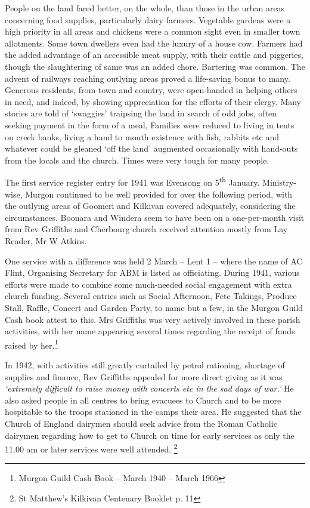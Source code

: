 People on the land fared better, on the whole, than those in the urban areas concerning food supplies, particularly dairy farmers. Vegetable gardens were a high priority in all areas and chickens were a common sight even in smaller town allotments. Some town dwellers even had the luxury of a house cow. Farmers had the added advantage of an accessible meat supply, with their cattle and piggeries, though the slaughtering of same was an added chore. Bartering was common. The advent of railways reaching outlying areas proved a life-saving bonus to many. Generous residents, from town and country, were open-handed in helping others in need, and indeed, by showing appreciation for the efforts of their clergy. Many stories are told of `swaggies' traipsing the land in search of odd jobs, often seeking payment in the form of a meal, Families were reduced to living in tents on creek banks, living a hand to mouth existence with fish, rabbits etc and whatever could be gleaned `off the land' augmented occasionally with hand-outs from the locals and the church. Times were very tough for many people.



The first service register entry for 1941 was Evensong on 5\textsuperscript{th} January. Ministry-wise, Murgon continued to be well provided for over the following period, with the outlying areas of Goomeri and Kilkivan covered adequately, considering the circumstances. Boonara and Windera seem to have been on a one-per-month visit from Rev Griffiths and Cherbourg church received attention mostly from Lay Reader, Mr W Atkins.



One service with a difference was held 2 March -- Lent 1 -- where the name of AC Flint, Organising Secretary for ABM is listed as officiating. During 1941, various efforts were made to combine some much-needed social engagement with extra church funding. Several entries such as Social Afternoon, Fete Takings, Produce Stall, Raffle, Concert and Garden Party, to name but a few, in the Murgon Guild Cash book attest to this. Mrs Griffiths was very actively involved in these parish activities, with her name appearing several times regarding the receipt of funds raised by her.\footnote{Murgon Guild Cash Book -- March 1940 -- March 1966}


In 1942, with activities still greatly curtailed by petrol rationing, shortage of supplies and finance, Rev Griffiths appealed for more direct giving as it was \emph{`extremely difficult to raise money with concerts etc in the sad days of war.'} He also asked people in all centres to bring evacuees to Church and to be more hospitable to the troops stationed in the camps their area. He suggested that the Church of England dairymen should seek advice from the Roman Catholic dairymen regarding how to get to Church on time for early services as only the 11.00 am or later services were well attended. \footnote{St Matthew's Kilkivan Centenary Booklet p. 11}


